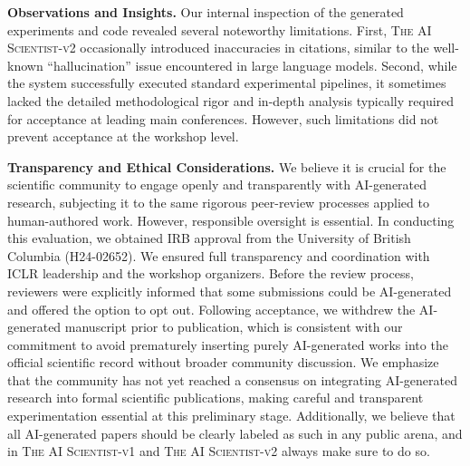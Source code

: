 \documentclass[11pt, a4paper]{include/gdm_format}
\newcommand{\oldalgo}{\textsc{The AI Scientist-v1}\xspace}
\newcommand{\ouralgo}{\textsc{The AI Scientist-v2}\xspace}
\begin{document}
\textbf{Observations and Insights.}
Our internal inspection of the generated experiments and code revealed several noteworthy limitations. First, \ouralgo occasionally introduced inaccuracies in citations, similar to the well-known ``hallucination'' issue encountered in large language models. Second, while the system successfully executed standard experimental pipelines, it sometimes lacked the detailed methodological rigor and in-depth analysis typically required for acceptance at leading main conferences. However, such limitations did not prevent acceptance at the workshop level.

\textbf{Transparency and Ethical Considerations.} 
We believe it is crucial for the scientific community to engage openly and transparently with AI-generated research, subjecting it to the same rigorous peer-review processes applied to human-authored work. However, responsible oversight is essential. In conducting this evaluation, we obtained IRB approval from the University of British Columbia (H24-02652). We ensured full transparency and coordination with ICLR leadership and the workshop organizers. Before the review process, reviewers were explicitly informed that some submissions could be AI-generated and offered the option to opt out. Following acceptance, we withdrew the AI-generated manuscript prior to publication, which is consistent with our commitment to avoid prematurely inserting purely AI-generated works into the official scientific record without broader community discussion. We emphasize that the community has not yet reached a consensus on integrating AI-generated research into formal scientific publications, making careful and transparent experimentation essential at this preliminary stage. Additionally, we believe that all AI-generated papers should be clearly labeled as such in any public arena, and in \oldalgo and \ouralgo always make sure to do so.
\end{document}
